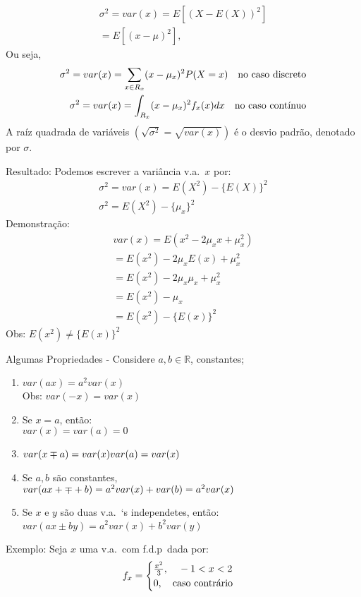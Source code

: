 \documentclass[11pt,a4paper]{book}
\begin{document}
\begin{enumerate}[label=(\alph*)]
\begin{enumerate}
\begin{align}
  \sigma^2=var(x)=E[(X-E(X))^2]\\
  =E[(x-\mu)^2],
\end{align}
Ou seja,
\begin{align}
  \sigma^2 =var(x)=\sum_{x \in R_{x}} (x-\mu_{x})^2 P(X=x) \text{\quad no caso discreto}\\
  \sigma^2 =var(x)=\int_{R_{x}} (x-\mu_{x})^2 f_{x}(x)dx \text{\quad no caso contínuo}
\end{align}
A raíz quadrada de variáveis $(\sqrt{\sigma^2}=\sqrt{var(x)})$ é o desvio padrão, 
denotado por $\sigma$.

Resultado: Podemos escrever a variância v.a.\ $x$ por: 
\begin{align}
  \sigma^2 =var(x)=E(X^2)-\{E(X)\}^2\\
  \sigma^2 =E(X^2)-\{\mu_x\}^2
\end{align}
Demonstração: 
\begin{align}
  var(x)=E(x^2-2\mu_{x}x+\mu_{x}^2)\\
  =E(x^2)-2\mu_{x}E(x)+\mu_{x}^2\\
  =E(x^2)-2\mu_{x}\mu_{x}+\mu_{x}^2\\
  =E(x^2)-\mu_{x}\\
  =E(x^2)-\{E(x)\}^2
\end{align}
Obs: $E(x^2) \neq \{E(x)\}^2$

Algumas Propriedades
- Considere $a,b \in \mathbb{R}$, constantes;
\begin{enumerate}[label=(\alph*)]
  \item $var(ax)=a^2var(x)$
    \\Obs: $var(-x)=var(x)$
  \item Se $x=a$, então:\\
    $var(x)=var(a)=0$
  \item $var(x \mp a)=var(x)var(a)\\ =var(x)$
  \item Se $a,b$ são constantes,\\
    $var(ax+\mp+b)=a^2 var(x)+var(b)\\
    =a^2 var(x)$
  \item Se $x$ e $y$ são duas v.a.\ `s independetes, então: 
    $var(ax \pm by)=a^2 var(x)+ b^2 var(y)$
\end{enumerate}
Exemplo: Seja $x$ uma v.a.\ com f.d.p\ dada por: 
\begin{align}
  f_{x}=
  \begin{cases}
    \frac{x^2}{3}, \text{\quad} -1<x<2\\
    0, \text{\quad caso contrário}
  \end{cases}
\end{align}


\end{enumerate}
\end{enumerate}
\end{document}
